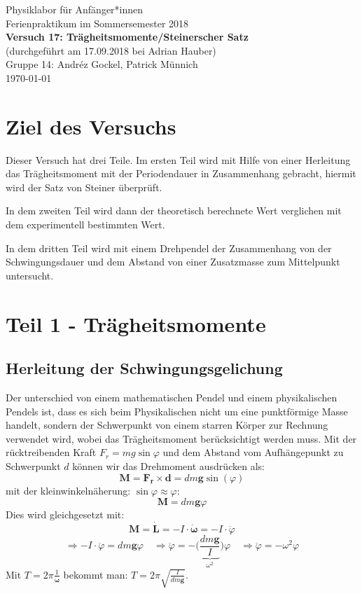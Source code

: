 \documentclass[11pt,a4paper]{article}
\renewcommand{\vec}{\boldsymbol}
\begin{document}
{
\centering 
\large 
Physiklabor für Anf\"anger*innen \\
Ferienpraktikum im Sommersemester 2018 \\[4mm]
\textbf{\LARGE 
Versuch 17: Trägheitsmomente/Steinerscher Satz
} \\[3mm]
(durchgef\"uhrt am 17.09.2018 bei Adrian Hauber)\\
Gruppe 14: Andréz Gockel, Patrick M\"unnich\\ 
\today \\[10mm]
}
\vfill
\tableofcontents
\vfill
\pagebreak

\section{Ziel des Versuchs}

Dieser Versuch hat drei Teile. Im ersten Teil wird mit Hilfe von einer Herleitung das Trägheitsmoment mit der Periodendauer in Zusammenhang gebracht, hiermit wird der Satz von Steiner überprüft.  

In dem zweiten Teil wird dann der theoretisch berechnete Wert verglichen mit dem experimentell bestimmten Wert. 

In dem dritten Teil wird mit einem Drehpendel der Zusammenhang von der Schwingungsdauer und dem Abstand von einer Zusatzmasse zum Mittelpunkt untersucht.
\section{Teil 1 - Trägheitsmomente}
\subsection{Herleitung der Schwingungsgelichung}

Der unterschied von einem mathematischen Pendel und einem physikalischen Pendels ist, dass es sich beim Physikalischen nicht um eine punktförmige Masse handelt, sondern der Schwerpunkt von einem starren Körper zur Rechnung verwendet wird, wobei das Trägheitsmoment berücksichtigt werden muss. Mit der rücktreibenden Kraft $F_r = mg\sin\varphi$ und dem Abstand vom Aufhängepunkt zu Schwerpunkt $d$ können wir das Drehmoment ausdrücken als:
$$\vec{M} = \vec{F_r} \times \vec{d} = dm\vec{g}\sin(\varphi)$$
mit der kleinwinkelnäherung: $\sin\varphi \approx \varphi$:
$$\vec{M} = dm\vec{g}\varphi$$
Dies wird gleichgesetzt mit:
$$\vec{M} = \vec{\dot L} = - I \cdot \vec{\dot\omega} = - I \cdot \ddot \varphi$$
$$\Rightarrow - I \cdot \ddot \varphi = dm\vec{g}\varphi \quad \Rightarrow \ddot \varphi = - \bigg(\underbrace{\frac{dm\vec{g}}{I}}_{\omega^2}\bigg)\varphi \quad \Rightarrow \ddot \varphi = - \omega^2 \varphi$$
Mit $T = 2\pi \frac{1}{\vec{\omega}}$ bekommt man: $T = 2\pi \sqrt{\frac{I}{dm\vec{g}}}$.
\end{document}
